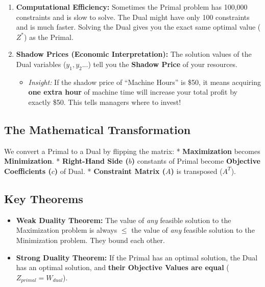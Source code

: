 \documentclass[
  letterpaper,
  DIV=11,
  numbers=noendperiod]{scrreprt}
\providecommand{\tightlist}{%
  \setlength{\itemsep}{0pt}\setlength{\parskip}{0pt}}
\begin{document}
\begin{enumerate}
\def\labelenumi{\arabic{enumi}.}
\tightlist
\item
  \textbf{Computational Efficiency:} Sometimes the Primal problem has
  100,000 constraints and is slow to solve. The Dual might have only 100
  constraints and is much faster. Solving the Dual gives you the exact
  same optimal value (\(Z^*\)) as the Primal.
\item
  \textbf{Shadow Prices (Economic Interpretation):} The solution values
  of the Dual variables (\(y_1, y_2...\)) tell you the \textbf{Shadow
  Price} of your resources.

  \begin{itemize}
  \tightlist
  \item
    \emph{Insight:} If the shadow price of ``Machine Hours'' is \$50, it
    means acquiring \textbf{one extra hour} of machine time will
    increase your total profit by exactly \$50. This tells managers
    where to invest!
  \end{itemize}
\end{enumerate}

\subsection{The Mathematical
Transformation}\label{the-mathematical-transformation}

We convert a Primal to a Dual by flipping the matrix: *
\textbf{Maximization} becomes \textbf{Minimization}. *
\textbf{Right-Hand Side (\(b\))} constants of Primal become
\textbf{Objective Coefficients (\(c\))} of Dual. * \textbf{Constraint
Matrix (\(A\))} is transposed (\(A^T\)).

\subsection{Key Theorems}\label{key-theorems}

\begin{itemize}
\tightlist
\item
  \textbf{Weak Duality Theorem:} The value of \emph{any} feasible
  solution to the Maximization problem is always \(\le\) the value of
  \emph{any} feasible solution to the Minimization problem. They bound
  each other.
\item
  \textbf{Strong Duality Theorem:} If the Primal has an optimal
  solution, the Dual has an optimal solution, and \textbf{their
  Objective Values are equal} (\(Z_{primal} = W_{dual}\)).
\end{itemize}
\end{document}
